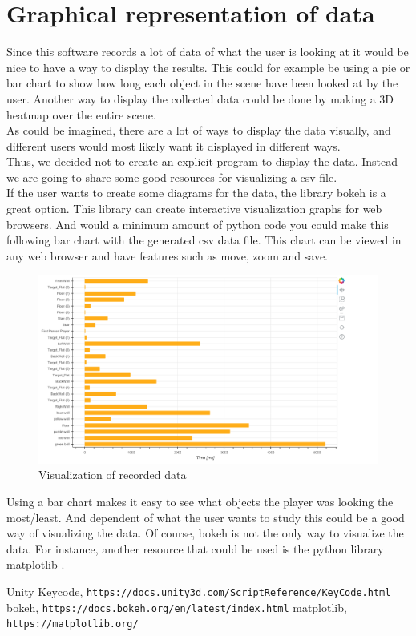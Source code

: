 \documentclass[letterpaper]{article}
\begin{document}
\section{Graphical representation of data}
Since this software records a lot of data of what the user is looking at it would be nice to have a way to display the results. This could for example be using a pie or bar chart to show how long each object in the scene have been looked at by the user. Another way to display the collected data could be done by making a 3D heatmap over the entire scene.\\[0.15in]
As could be imagined, there are a lot of ways to display the data visually, and different users would most likely want it displayed in different ways.\\[0.15in]
Thus, we decided not to create an explicit program to display the data. Instead we are going to share some good resources for visualizing a csv file.\\[0.15in]
If the user wants to create some diagrams for the data, the library bokeh \cite{bokeh} is a great option. This library can create interactive visualization graphs for web browsers. And would a minimum amount of python code you could make this following bar chart with the generated csv data file. This chart can be viewed in any web browser and have features such as move, zoom and save.
\newpage
\begin{figure}[h!]
  \centering \includegraphics[keepaspectratio,scale=0.3]{GraphStuff.png}
  \caption{Visualization of recorded data}
  \label{fig:graphvisualization}
\end{figure}
\noindent Using a bar chart makes it easy to see what objects the player was looking the most/least. And dependent of what the user wants to study this could be a good way of visualizing the data.
Of course, bokeh is not the only way to visualize the data. For instance, another resource that could be used is the python library matplotlib \cite{matplotlib}.
\newpage
\begin{thebibliography}{9}
Unity Keycode,
\texttt{https://docs.unity3d.com/ScriptReference/KeyCode.html}
bokeh, 
\texttt{https://docs.bokeh.org/en/latest/index.html}
matplotlib,
\texttt{https://matplotlib.org/}

\end{thebibliography}
\end{document}
